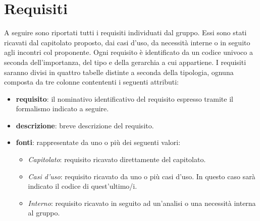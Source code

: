 %


\section{Requisiti}

A seguire sono riportati tutti i requisiti individuati dal gruppo. Essi sono stati ricavati dal capitolato proposto, dai casi d'uso, da necessità interne o in seguito agli incontri col proponente. Ogni requisito è identificato da un codice univoco a seconda dell'importanza, del tipo e della gerarchia a cui appartiene. 
I requisiti saranno divisi in quattro tabelle distinte a seconda della tipologia, ognuna composta da tre colonne contententi i seguenti attributi:
\begin{itemize}
\item \textbf{requisito}: il nominativo identificativo del requisito espresso tramite il formalismo indicato a seguire.
\item \textbf{descrizione}: breve descrizione del requisito.
\item \textbf{fonti}: rappresentate da uno o più dei seguenti valori:
	\begin{itemize}
	\item \emph{Capitolato}: requisito ricavato direttamente del capitolato.
	\item \emph{Casi d'uso}: requisito ricavato da uno o più casi d'uso. In questo caso sarà indicato il codice di quest'ultimo/i.
	\item \emph{Interno}: requisito ricavato in seguito ad un'analisi o una necessità interna al gruppo.
	\end{itemize}
\end{itemize}


